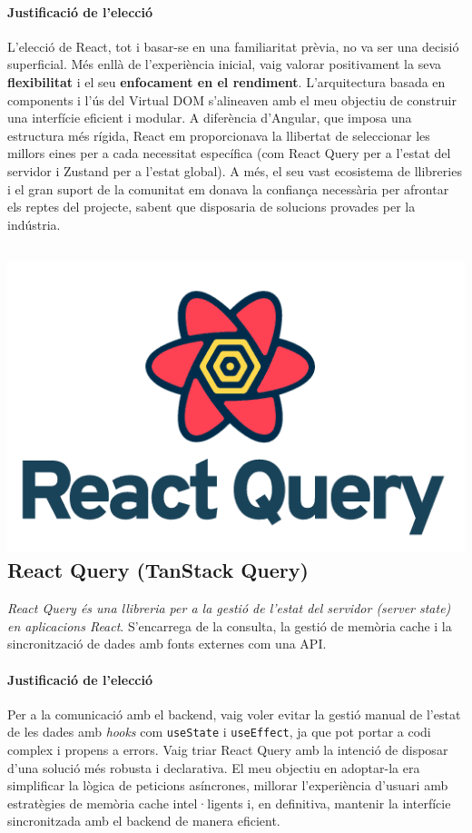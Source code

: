 \paragraph{Justificació de l'elecció}
L'elecció de React, tot i basar-se en una familiaritat prèvia, no va ser una decisió superficial. Més enllà de l'experiència inicial, vaig valorar positivament la seva \textbf{flexibilitat} i el seu \textbf{enfocament en el rendiment}. L'arquitectura basada en components i l'ús del Virtual DOM s'alineaven amb el meu objectiu de construir una interfície eficient i modular. A diferència d'Angular, que imposa una estructura més rígida, React em proporcionava la llibertat de seleccionar les millors eines per a cada necessitat específica (com React Query per a l'estat del servidor i Zustand per a l'estat global). A més, el seu vast ecosistema de llibreries i el gran suport de la comunitat em donava la confiança necessària per afrontar els reptes del projecte, sabent que disposaria de solucions provades per la indústria.

\FloatBarrier
\newcommand{\reactquery}{\includegraphics[height=8ex]{Figures/logos/reactQuery.png}}

\subsection{\reactquery\hspace{0.5em}React Query (TanStack Query)}
\textit{React Query és una llibreria per a la gestió de l'estat del servidor (server state) en aplicacions React}. S'encarrega de la consulta, la gestió de memòria cache i la sincronització de dades amb fonts externes com una API.

\paragraph{Justificació de l'elecció}
Per a la comunicació amb el backend, vaig voler evitar la gestió manual de l'estat de les dades amb \textit{hooks} com \texttt{useState} i \texttt{useEffect}, ja que pot portar a codi complex i propens a errors. Vaig triar React Query amb la intenció de disposar d'una solució més robusta i declarativa. El meu objectiu en adoptar-la era simplificar la lògica de peticions asíncrones, millorar l'experiència d'usuari amb estratègies de memòria cache intel·ligents i, en definitiva, mantenir la interfície sincronitzada amb el backend de manera eficient.

